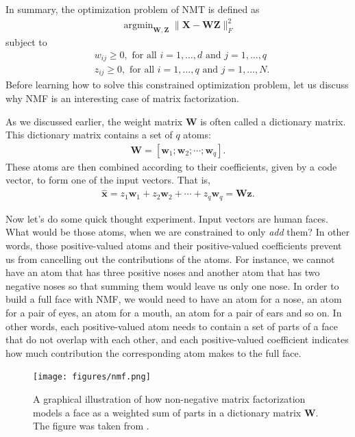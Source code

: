 \documentclass{report}
\newcommand{\vect}[1]{\mathbf{#1}}
\newcommand{\matr}[1]{\mathbf{#1}}
\newcommand{\vx}[0]{\vect{x}}
\newcommand{\vz}[0]{\vect{z}}
\newcommand{\vw}[0]{\vect{w}}
\newcommand{\mW}[0]{\matr{W}}
\newcommand{\mZ}[0]{\matr{Z}}
\newcommand{\mX}[0]{\matr{X}}
\DeclareMathOperator*{\argmin}{\arg \min}
\begin{document}
In summary, the optimization problem of NMT is defined as
\begin{align}
    \label{eq:nmf}
    \argmin_{\mW, \mZ} \| \mX - \mW \mZ \|_F^2
\end{align}
subject to
\begin{align*}
    &w_{ij} \geq 0,\text{ for all }i=1,\ldots,d\text{ and }j=1,\ldots,q \\
    &z_{ij} \geq 0,\text{ for all }i=1,\ldots,q\text{ and }j=1,\ldots,N.
\end{align*}
Before learning how to solve this constrained optimization problem, let us
discuss why NMF is an interesting case of matrix factorization. 

As we discussed earlier, the weight matrix $\mW$ is often called a dictionary
matrix. This dictionary matrix contains a set of $q$ atoms:
\begin{align*}
    \mW = \left[ \vw_1; \vw_2; \cdots; \vw_q \right].
\end{align*}
These atoms are then combined according to their coefficients, given by a code
vector, to form one of the input vectors. That is,
\begin{align*}
    \hat{\vx} = z_1 \vw_1 + z_2 \vw_2 + \cdots + z_q \vw_q = \mW \vz.
\end{align*}

Now let's do some quick thought experiment. Input vectors are human faces. What
would be those atoms, when we are constrained to only {\it add} them? In other
words, those positive-valued atoms and their positive-valued coefficients
prevent us from cancelling out the contributions of the atoms. For instance, we
cannot have an atom that has three positive noses and another atom that has two
negative noses so that summing them would leave us only one nose. In order to
build a full face with NMF, we would need to have an atom for a nose, an atom
for a pair of eyes, an atom for a mouth, an atom for a pair of ears and so on.
In other words, each positive-valued atom needs to contain a set of parts of a
face that do not overlap with each other, and each positive-valued coefficient
indicates how much contribution the corresponding atom makes to the full face.

\begin{figure}[t]
    \centering
    \begin{minipage}{0.59\columnwidth}
        \centering
        \texttt{[image: figures/nmf.png]}
    \end{minipage}
    \begin{minipage}{0.4\columnwidth}
        \caption{
            \label{fig:nmf}
            A graphical illustration of how non-negative matrix factorization
            models a face as a weighted sum of parts in a dictionary matrix
            $\mW$. The figure was taken from \cite{lee2001algorithms}.
        }
    \end{minipage}
\end{figure}
\end{document}
